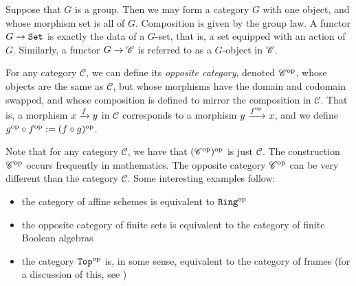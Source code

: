 \documentclass{article}[11pt]
\begin{document}

\begin{example} Suppose that $G$ is a group. Then we may form a category $G$ with one object, and whose morphism set is all of $G$. Composition is given by the group law. A functor $G \to \texttt{Set}$ is exactly the data of a $G$-set, that is, a set equipped with an action of $G$. Similarly, a functor $G \to \mathscr{C}$ is referred to as a $G$-object in $\mathscr{C}$.
\end{example}


\begin{definition} For any category $\mathscr{C}$, we can define its \textit{opposite category}, denoted $\mathscr{C}^{\text{op}}$, whose objects are the same as $\mathscr{C}$, but whose morphisms have the domain and codomain swapped, and whose composition is defined to mirror the composition in $\mathscr{C}$. That is, a morphism $x\xrightarrow{f} y$ in $\mathscr{C}$ corresponds to a morphism $y\xrightarrow{f^{\text{op}}} x$, and we define $g^{\text{op}} \circ f^{\text{op}} := (f\circ g)^{\text{op}}$.
\end{definition}

Note that for any category $\mathscr{C}$, we have that $(\mathscr{C}^{\text{op}})^{\text{op}}$ is just $\mathscr{C}$. The construction $\mathscr{C}^{\text{op}}$ occurs frequently in mathematics. The opposite category $\mathscr{C}^{\text{op}}$ can be very different than the category $\mathscr{C}$. Some interesting examples follow:
\vspace{-1em}
\begin{itemize}\itemsep0em 
    \item the category of affine schemes is equivalent to $\texttt{Ring}^{\text{op}}$
     \item the opposite category of finite sets is equivalent to the category of finite Boolean algebras
    \item the category $\texttt{Top}^{\text{op}}$ is, in some sense, equivalent to the category of frames  (for a discussion of this, see \cite{top-op-mathse})
\end{itemize}
\end{document}
